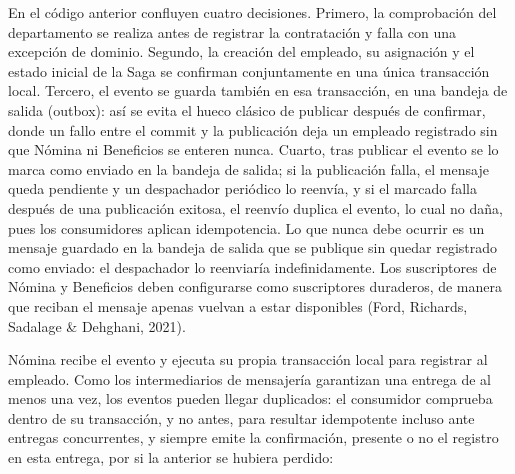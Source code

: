 \documentclass[12pt, a4paper]{article}
\begin{document}
    En el código anterior confluyen cuatro decisiones. Primero, la comprobación del departamento se realiza antes de registrar la contratación y falla con una excepción de dominio. Segundo, la creación del empleado, su asignación y el estado inicial de la Saga se confirman conjuntamente en una única transacción local. Tercero, el evento se guarda también en esa transacción, en una bandeja de salida (outbox): así se evita el hueco clásico de publicar después de confirmar, donde un fallo entre el commit y la publicación deja un empleado registrado sin que Nómina ni Beneficios se enteren nunca. Cuarto, tras publicar el evento se lo marca como enviado en la bandeja de salida; si la publicación falla, el mensaje queda pendiente y un despachador periódico lo reenvía, y si el marcado falla después de una publicación exitosa, el reenvío duplica el evento, lo cual no daña, pues los consumidores aplican idempotencia. Lo que nunca debe ocurrir es un mensaje guardado en la bandeja de salida que se publique sin quedar registrado como enviado: el despachador lo reenviaría indefinidamente. Los suscriptores de Nómina y Beneficios deben configurarse como suscriptores duraderos, de manera que reciban el mensaje apenas vuelvan a estar disponibles (Ford, Richards, Sadalage \& Dehghani, 2021).

    Nómina recibe el evento y ejecuta su propia transacción local para registrar al empleado. Como los intermediarios de mensajería garantizan una entrega de al menos una vez, los eventos pueden llegar duplicados: el consumidor comprueba dentro de su transacción, y no antes, para resultar idempotente incluso ante entregas concurrentes, y siempre emite la confirmación, presente o no el registro en esta entrega, por si la anterior se hubiera perdido:
\end{document}
